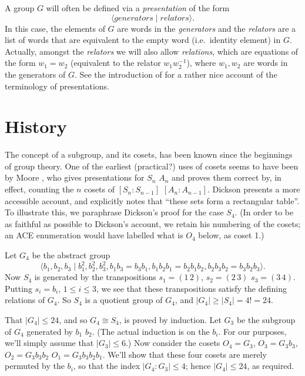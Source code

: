 A group $G$ will often be defined via a \emph{presentation} of the form
  $$\langle \textit{generators} \mid \textit{relators} \rangle.$$
In this case, the elements of $G$ are words in the \emph{generators}
  and the \emph{relators} are a list of words that are equivalent to 
  the empty word (i.e.~identity element) in $G$. 
Actually, amongst the \emph{relators} we will also allow \emph{relations},
  which are equations of the form $w_1 = w_2$ (equivalent to the relator 
  $w_1w_2^{-1}$), where $w_1, w_2$ are words in the generators of $G$.
See the introduction of \cite{MKS76} for a rather nice account of the
  terminology of presentations.

\section{History}

The concept of a subgroup, and its cosets, has been known since the 
  beginnings of group theory.
One of the earliest (practical?) uses of cosets seems to have been by
  Moore \cite{Moo97}, who gives presentations for $S_n$ \amp $A_n$ and
  proves them correct by, in effect, counting the $n$ cosets of 
  $[S_n:S_{n-1}]$ \amp $[A_n:A_{n-1}]$.
Dickson \cite[\S264]{Dic01} presents a more accessible account, and 
  explicitly notes that ``these sets form a rectangular table''\kern-2pt.
%
To illustrate this, we paraphrase Dickson's proof for the case $S_4$.
(In order to be as faithful as possible to Dickson's account, we retain
his numbering of the cosets; an ACE enumeration would have labelled what
is $O_4$ below, as coset 1.)

Let $G_4$ be the abstract group
  $$ \langle b_1,b_2,b_3 \mid b_1^2,b_2^2,b_3^2,
       b_1b_3=b_3b_1, b_1b_2b_1=b_2b_1b_2,b_2b_3b_2=b_3b_2b_3 \rangle . $$
Now $S_4$ is generated by the transpositions $s_1=(1\,2)$, $s_2=(2\,3)$ \amp 
  $s_3=(3\,4)$.
Putting $s_i=b_i$, $1 \le i \le 3$, we see that these transpositions 
  satisfy the defining relations of $G_4$.
So $S_4$ is a quotient group of $G_4$, and $|G_4| \ge |S_4| = 4! = 24$.

That $|G_4| \le 24$, and so $G_4 \cong S_4$, is proved by induction.
Let $G_3$ be the subgroup of $G_4$ generated by $b_1$ \amp $b_2$.
(The actual induction is on the $b_i$.
For our purposes, we'll simply assume that $|G_3| \le 6$.)
Now consider the cosets $O_4=G_3$, $O_3=G_3b_3$, $O_2=G_3b_3b_2$ \amp 
  $O_1=G_3b_3b_2b_1$.
We'll show that these four cosets are merely permuted by the $b_i$, so
  that the index $|G_4 : G_3| \le 4$; hence $|G_4| \le 24$, as required.

